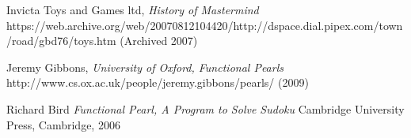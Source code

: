 \documentclass[12pt]{article}  %
\theoremstyle{definition}
\theoremstyle{remark}
\begin{document}
%
%
%
\begin{thebibliography}{99}

% 
%



%

%




Invicta Toys and Games ltd,
{\em History of Mastermind}
https://web.archive.org/web/20070812104420/http://dspace.dial.pipex.com/town/road/gbd76/toys.htm
(Archived 2007)

Jeremy Gibbons,
{\em University of Oxford, Functional Pearls}
http://www.cs.ox.ac.uk/people/jeremy.gibbons/pearls/
(2009)

Richard Bird
{\em Functional Pearl, A Program to Solve Sudoku}
Cambridge University Press, Cambridge, 2006

\end{thebibliography}
\end{document}
